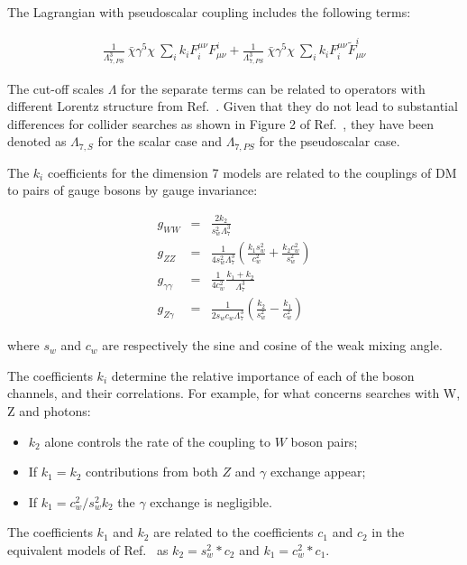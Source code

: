 The Lagrangian with pseudoscalar coupling includes the following terms:

\begin{eqnarray}
\frac{1}{\Lambda_{7,PS}^3} ~\bar{\chi} \gamma^5 \chi ~ \sum_i k_i  F_i^{\mu \nu} F^i_{\mu \nu} +
\frac{1}{\Lambda_{7,PS}^3} ~\bar{\chi} \gamma^5 \chi ~ \sum_i k_i  F_i^{\mu \nu} \tilde F^i_{\mu \nu}
\end{eqnarray}

The cut-off scales $\Lambda$ for the separate terms can be related to operators with different 
Lorentz structure from Ref.~\cite{Cotta:2012nj}. Given that they do not lead to 
substantial differences for collider searches as shown in Figure 2 of Ref.~\cite{Carpenter:2012rg}, 
they have been denoted as $\Lambda_{7,S}$ for the scalar case and  $\Lambda_{7,PS}$ for the pseudoscalar
case. 

The $k_i$ coefficients for the dimension 7 models are related to the couplings of DM to pairs of gauge 
bosons by gauge invariance: 

\begin{eqnarray}
g_{WW}&=&\frac{2k_2}{s_w^2 \Lambda_7^3} \\
g_{ZZ} &=& \frac{1}{4 s_w^2 \Lambda_7^3} \left(\frac{k_1 s_w^2}{c_w^2}+\frac{k_2 c_w^2}{s_w^2} \right) \\
g_{\gamma\gamma}&=&\frac{1}{4 c_w^2}\frac{k_1+k_2}{\Lambda_7^3} \\
g_{Z\gamma} &=& \frac{1}{2 s_w c_w \Lambda_7^3} \left(\frac{k_2}{s_w^2}-\frac{k_1}{c_w^2} \right)
\label{eq:prefactors}
\end{eqnarray}

where $s_w$ and $c_w$ are respectively the sine and cosine of the weak mixing angle. 

The coefficients $k_i$ determine the relative importance of each of the boson channels,
and their correlations. For example, for what concerns searches with W, Z and photons: 
\begin{itemize}
 \item $k_2$ alone controls the rate of the coupling to $W$ boson pairs;
 \item If $k_1 = k_2$ contributions from both $Z$ and $\gamma$ exchange appear;
 \item If $k_1 = c_w^2 / s_w^2 k_2$ the $\gamma$ exchange is negligible. 
\end{itemize}

The coefficients $k_1$ and $k_2$ are related to the coefficients $c_1$ and $c_2$ 
in the equivalent models of Ref.~\cite{Crivellin:2015wva} as $k_2 = s_w^2*c_2$ and $k_1=c_w^2 *c_1$.

